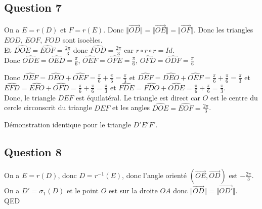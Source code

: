 \documentclass[]{book}
\theoremstyle{definition}
\begin{document}
\subsection*{Question 7}
On a $E = r(D)$ et $F = r(E)$. Donc $\Vert \overrightarrow{OD} \Vert = \Vert \overrightarrow{OE} \Vert = \Vert \overrightarrow{OF} \Vert$. Donc les triangles $EOD$, $EOF$, $FOD$ sont isoc\`eles.\\

Et $\widehat{DOE} = \widehat{EOF} = \frac{2\pi}{3}$ donc $\widehat{FOD} = \frac{2\pi}{3}$ car $r \circ r \circ r = Id$.\\

Donc $\widehat{ODE} = \widehat{OED} = \frac{\pi}{6}$, $\widehat{OEF} = \widehat{OFE} = \frac{\pi}{6}$, $\widehat{OFD} = \widehat{ODF} = \frac{\pi}{6}$ 

Donc $\widehat{DEF} = \widehat{DEO} + \widehat{OEF} = \frac{\pi}{6} + \frac{\pi}{6} = \frac{\pi}{3}$ et 
$\widehat{DEF} = \widehat{DEO} + \widehat{OEF} = \frac{\pi}{6} + \frac{\pi}{6} = \frac{\pi}{3}$ et 
$\widehat{EFD} = \widehat{EFO} + \widehat{OFD} = \frac{\pi}{6} + \frac{\pi}{6} = \frac{\pi}{3}$ et
$\widehat{FDE} = \widehat{FDO} + \widehat{ODE} = \frac{\pi}{6} + \frac{\pi}{6} = \frac{\pi}{3}$.\\

Donc, le triangle $DEF$ est \'equilat\'eral.
Le triangle est direct car $O$ est le centre du cercle circonscrit du triangle $DEF$ et les angles  $\widehat{DOE} = \widehat{EOF} = \frac{2\pi}{3}$.

D\'emonstration identique pour le triangle $D'E'F'$.\\


\subsection*{Question 8}
On a $E=r(D)$, donc $D = r^{-1}(E)$, donc l'angle orient\'e $(\overrightarrow{OE},\overrightarrow{OD})$ est $-\frac{2\pi}{3}$.\\

On a $D'=\sigma_1(D)$ et le point $O$ est sur la droite $OA$ donc $\Vert \overrightarrow{OD} \Vert = \Vert \overrightarrow{OD'} \Vert$.\\

QED
\end{document}
